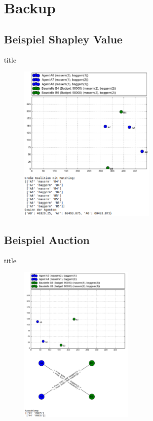 \documentclass[c]{beamer}
\theoremstyle{break}
\begin{document}
  \section*{Backup}
  \subsection*{Beispiel Shapley Value}
  \begin{frame}{title}
    \begin{figure}
      \centering
      \includegraphics[width=0.6\textwidth]{example-shapley-value.png}
    \end{figure}
  \end{frame}

  \subsection*{Beispiel Auction}  
  \begin{frame}{title}
    \begin{figure}
      \centering
      \includegraphics[width=0.5\textwidth]{example-srg.png}
    \end{figure}
  \end{frame}
\end{document}

